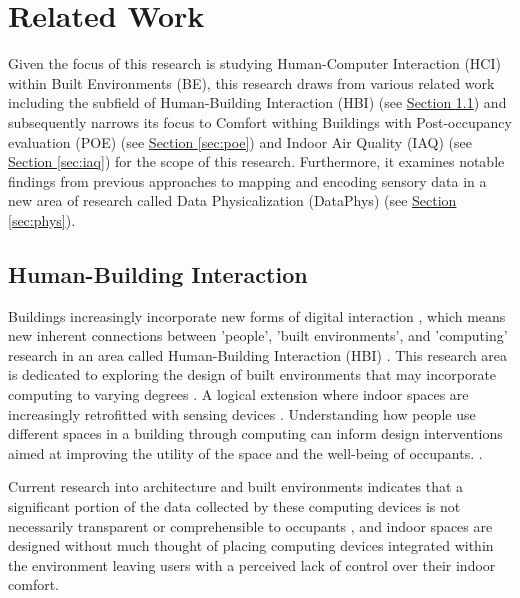 \section{Related Work}
\label{sec:related_work}
Given the focus of this research is studying Human-Computer Interaction (HCI) within Built Environments (BE), this research draws from various related work including the subfield of Human-Building Interaction (HBI) (see \hyperref[sec:hbi]{Section \ref*{sec:hbi}}) and subsequently narrows its focus to Comfort withing Buildings with Post-occupancy evaluation (POE) (see \hyperref[sec:poe]{Section \ref*{sec:poe}}) and Indoor Air Quality (IAQ) (see \hyperref[sec:iaq]{Section \ref*{sec:iaq}}) for the scope of this research. Furthermore, it examines notable findings from previous approaches to mapping and encoding sensory data in a new area of research called Data Physicalization (DataPhys) (see \hyperref[sec:phys]{Section \ref*{sec:phys}}).

\subsection{Human-Building Interaction}
\label{sec:hbi}

Buildings increasingly incorporate new forms of digital interaction \cite{pulsipher_towards_2023, margariti_understanding_2023}, which means new inherent connections between 'people', 'built environments', and 'computing' research in an area called Human-Building Interaction (HBI) \cite{alavi_introduction_2019, taherkhani_human-building_2023}. This research area is dedicated to exploring the design of built environments that may incorporate computing to varying degrees \cite{sowles_introducing_2021}.  A logical extension where indoor spaces are increasingly retrofitted with sensing devices \cite{pulsipher_towards_2023}. Understanding how people use different spaces in a building through computing can inform design interventions aimed at improving the utility of the space and the well-being of occupants. \cite{verma_studying_2017}. 

Current research into architecture and built environments indicates that a significant portion of the data collected by these computing devices is not necessarily transparent or comprehensible to occupants \cite{schnadelbach_adaptive_2019}, and indoor spaces are designed without much thought of placing computing devices integrated within the environment \cite{johansen_temporal_2019, kirsh_architects_2019} leaving users with a perceived lack of control over their indoor comfort. 

